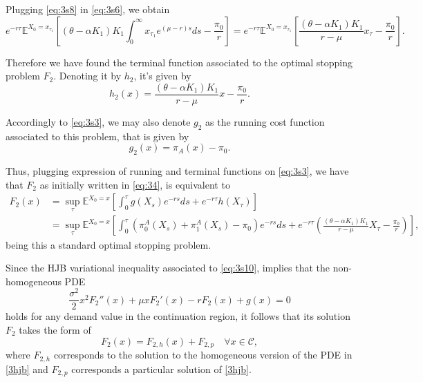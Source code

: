 Plugging \eqref{eq:3s8} in \eqref{eq:3s6}, we obtain
\begin{equation}
e^{-r\tau} \mathds{E}^{X_0=x_{\tau_1}} \left[   (\theta-\alpha K_1)K_1 \int_{0}^\infty x_{\tau_1} e^{\left( \mu-r \right)s} ds -\frac{\pi_0}{r} \right] = e^{-r\tau} \mathds{E}^{X_0=x_{\tau_1}} \left[   \frac{(\theta-\alpha K_1)K_1}{r-\mu} x_{\tau} -\frac{\pi_0}{r} \right].
\label{eq:3s9}
\end{equation}

Therefore we have found the terminal function associated to the optimal stopping problem $F_2$. Denoting it by $h_2$, it's given by
$$h_2(x)=\frac{(\theta-\alpha K_1)K_1}{r-\mu} x -\frac{\pi_0}{r}.$$

Accordingly to \eqref{eq:3s3}, we may also denote $g_2$ as the running cost function associated to this problem, that is given by
$$g_2(x)=\pi_A(x)-\pi_0.$$

Thus, plugging expression of running and terminal functions on \eqref{eq:3s3}, we have that $F_2$ as initially written in \eqref{eq:34}, is equivalent to
\begin{align}
F_2(x)&=\sup_{\tau} \mathds{E}^{X_0=x} \left[ \int_0^{\tau} g(X_s) e^{-rs}ds + e^{-r\tau}h(X_\tau)  \right]\\
&=\sup_{\tau} \mathds{E}^{X_0=x} \left[ \int_0^{\tau} \left( \pi_0^A(X_s)+\pi_1^A(X_s)-\pi_0 \right) e^{-rs}ds + e^{-r\tau} \left(   \frac{(\theta-\alpha K_1)K_1}{r-\mu} X_{\tau} -\frac{\pi_0}{r} \right)  \right],
\label{eq:3s10}
\end{align}
being this a standard optimal stopping problem.

Since the HJB variational inequality associated to \eqref{eq:3s10}, implies that the non-homogeneous PDE 
\begin{equation}
\frac{\sigma^2}{2}x^2F_2''(x)+\mu x F_2'(x) - r F_2(x)+g(x) =0 
\label{3hjb}
\end{equation}
holds for any demand value in the continuation region, it follows that its solution $F_2$ takes the form of
\begin{equation}
F_2(x)=F_{2,h}(x)+F_{2,p} \quad \forall x \in \mathcal{C},
\end{equation}
where $F_{2,h}$ corresponds to the solution to the homogeneous version of the PDE in \eqref{3hjb} and $F_{2,p}$ corresponds a particular solution of \eqref{3hjb}.

